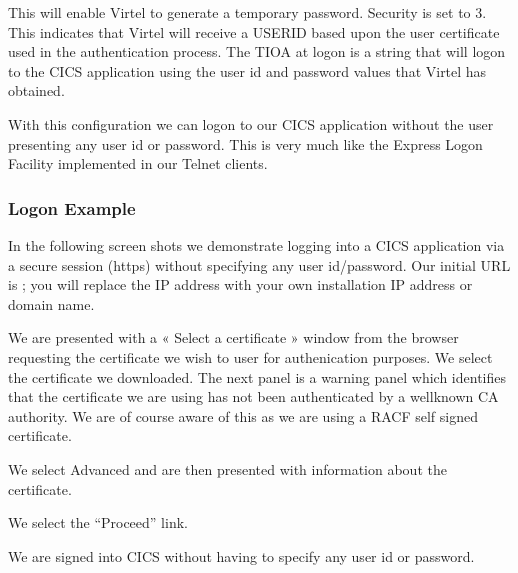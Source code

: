 \documentclass[letterpaper,10pt,english]{sphinxmanual}
\begin{document}
\sphinxAtStartPar
{}

\sphinxAtStartPar
{} This will enable Virtel to generate a temporary password. Security is set to 3. This indicates that Virtel will receive a USERID based upon the user certificate used in the authentication process. The TIOA at logon is a string that will logon to the CICS application using the user id and password values that Virtel has
obtained.

\sphinxAtStartPar
With this configuration we can logon to our CICS application without the user presenting any user id or password. This is very much like the Express Logon Facility implemented in our Telnet clients.


\subsubsection{Logon Example}
\label{\detokenize{Customization:logon-example}}
\sphinxAtStartPar
In the following screen shots we demonstrate logging into a CICS application via a secure session (https) without specifying any user id/password. Our initial URL is ; you will replace the IP address with your own installation IP address or domain name.

\sphinxAtStartPar
{}

\sphinxAtStartPar
We are presented with a « Select a certificate » window from the browser requesting the certificate we wish to user for authenication purposes. We select the certificate we downloaded. The next panel is a warning panel which identifies that the certificate we are using has not been authenticated by a well\sphinxhyphen{}known CA authority. We are of course aware of this as we are using a RACF self signed certificate.

\sphinxAtStartPar
{}

\sphinxAtStartPar
We select Advanced and are then presented with information about the certificate.

\sphinxAtStartPar
{}

\sphinxAtStartPar
We select the “Proceed” link.

\sphinxAtStartPar
{}

\sphinxAtStartPar
We are signed into CICS without having to specify any user id or password.
\end{document}
